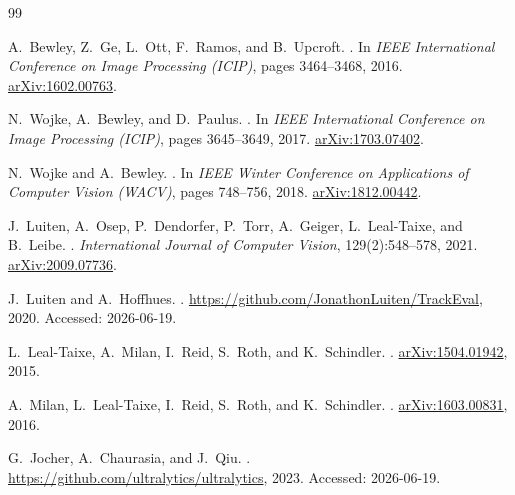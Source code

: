 \documentclass[12pt, a4paper]{article}
\begin{document}
\newpage
\begin{thebibliography}{99}

A.~Bewley, Z.~Ge, L.~Ott, F.~Ramos, and B.~Upcroft.
.
\newblock In \emph{IEEE International Conference on Image Processing (ICIP)}, pages 3464--3468, 2016.
\newblock \href{https://arxiv.org/abs/1602.00763}{arXiv:1602.00763}.

N.~Wojke, A.~Bewley, and D.~Paulus.
.
\newblock In \emph{IEEE International Conference on Image Processing (ICIP)}, pages 3645--3649, 2017.
\newblock \href{https://arxiv.org/abs/1703.07402}{arXiv:1703.07402}.

N.~Wojke and A.~Bewley.
.
\newblock In \emph{IEEE Winter Conference on Applications of Computer Vision (WACV)}, pages 748--756, 2018.
\newblock \href{https://arxiv.org/abs/1812.00442}{arXiv:1812.00442}.

J.~Luiten, A.~Osep, P.~Dendorfer, P.~Torr, A.~Geiger, L.~Leal-Taixe, and B.~Leibe.
.
\newblock \emph{International Journal of Computer Vision}, 129(2):548--578, 2021.
\newblock \href{https://arxiv.org/abs/2009.07736}{arXiv:2009.07736}.

J.~Luiten and A.~Hoffhues.
.
\newblock \url{https://github.com/JonathonLuiten/TrackEval}, 2020. Accessed: 2026-06-19.

L.~Leal-Taixe, A.~Milan, I.~Reid, S.~Roth, and K.~Schindler.
.
\newblock \href{https://arxiv.org/abs/1504.01942}{arXiv:1504.01942}, 2015.

A.~Milan, L.~Leal-Taixe, I.~Reid, S.~Roth, and K.~Schindler.
.
\newblock \href{https://arxiv.org/abs/1603.00831}{arXiv:1603.00831}, 2016.

G.~Jocher, A.~Chaurasia, and J.~Qiu.
.
\newblock \url{https://github.com/ultralytics/ultralytics}, 2023. Accessed: 2026-06-19.


\end{thebibliography}
\end{document}
